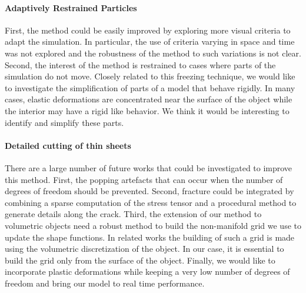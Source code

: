 \paragraph{Adaptively Restrained Particles} First, the method could be easily improved by exploring more visual criteria to adapt the simulation. In particular, the use of criteria varying in space and time was not explored and the robustness of the method to such variations is not clear. Second, the interest of the method is restrained to cases where parts of the simulation do not move. Closely related to this freezing technique, we would like to investigate the simplification of parts of a model that behave rigidly. In many cases, elastic deformations are concentrated near the surface of the object while the interior may have a rigid like behavior. We think it would be interesting to identify and simplify these parts.

\paragraph{Detailed cutting of thin sheets} There are a large number of future works that could be investigated to improve this method. First, the popping artefacts that can occur when the number of degrees of freedom should be prevented. Second, fracture could be integrated by combining a sparse computation of the stress tensor and a procedural method to generate details along the crack. Third, the extension of our method to volumetric objects need a robust method to build the non-manifold grid we use to update the shape functions. In related works the building of such a grid is made using the volumetric discretization of the object. In our case, it is essential to build the grid only from the surface of the object. Finally, we would like to incorporate plastic deformations while keeping a very low number of degrees of freedom and bring our model to real time performance.

